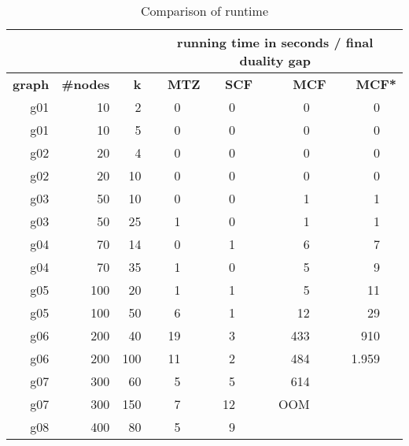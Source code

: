\documentclass{article}
\begin{document}
	\begin{table}[htbp]
		\centering
		\caption{Comparison of runtime}
		\begin{tabular}{rrr|rr|rr|rr|rr}
			&       &       & \multicolumn{8}{c}{running time in seconds / final duality gap } \\
			\midrule
			\multicolumn{1}{p{3em}}{\textbf{graph}} & \multicolumn{1}{p{3em}}{\textbf{\#nodes}} & \multicolumn{1}{r|}{\textbf{k}} & \multicolumn{2}{p{6em}|}{\textbf{MTZ}} & \multicolumn{2}{p{6em}|}{\textbf{SCF}} & \multicolumn{2}{p{6em}|}{\textbf{MCF}} & \multicolumn{2}{p{6em}}{\textbf{MCF*}} \\
			\midrule
			g01   & 10    & 2     & 0     &       & 0     &       & 0     &       & 0     &  \\
			g01   & 10    & 5     & 0     &       & 0     &       & 0     &       & 0     &  \\
			g02   & 20    & 4     & 0     &       & 0     &       & 0     &       & 0     &  \\
			g02   & 20    & 10    & 0     &       & 0     &       & 0     &       & 0     &  \\
			g03   & 50    & 10    & 0     &       & 0     &       & 1     &       & 1     &  \\
			g03   & 50    & 25    & 1     &       & 0     &       & 1     &       & 1     &  \\
			g04   & 70    & 14    & 0     &       & 1     &       & 6     &       & 7     &  \\
			g04   & 70    & 35    & 1     &       & 0     &       & 5     &       & 9     &  \\
			g05   & 100   & 20    & 1     &       & 1     &       & 5     &       & 11    &  \\
			g05   & 100   & 50    & 6     &       & 1     &       & 12    &       & 29    &  \\
			g06   & 200   & 40    & 19    &       & 3     &       & 433   &       & 910   &  \\
			g06   & 200   & 100   & 11    &       & 2     &       & 484   &       & 1.959 &  \\
			g07   & 300   & 60    & 5     &       & 5     &       & 614   &       &       &  \\
			g07   & 300   & 150   & 7     &       & 12    &       & OOM   &       &       &  \\
			g08   & 400   & 80    & 5     &       & 9     &       &       &       &       &  \\

\end{tabular}
\end{table}
\end{document}

